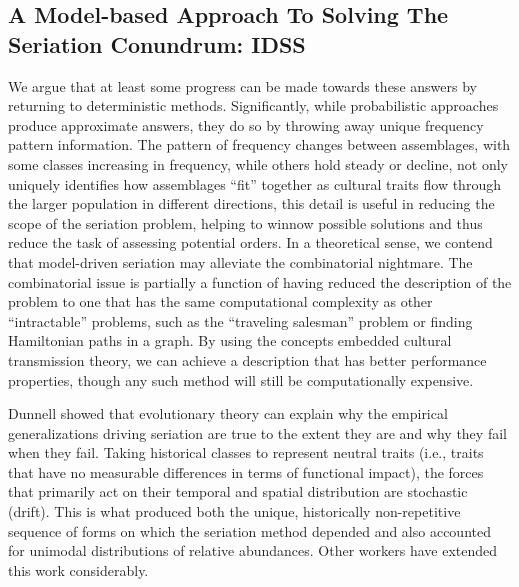 \documentclass[10pt,letterpaper]{article}
\begin{document}
\subsection*{A Model-based Approach To Solving The Seriation Conundrum: IDSS}
We argue that at least some progress can be made towards these answers by returning to deterministic methods. Significantly, while probabilistic approaches produce approximate answers, they do so by throwing away unique frequency pattern information.  The pattern of frequency changes between assemblages, with some classes increasing in frequency, while others hold steady or decline, not only uniquely identifies how assemblages “fit” together as cultural traits flow through the larger population in different directions, this detail is useful in reducing the scope of the seriation problem, helping to winnow possible solutions and thus reduce the task of assessing potential orders. In a theoretical sense, we contend that model-driven seriation may alleviate the combinatorial nightmare. The combinatorial issue is partially a function of having reduced the description of the problem to one that has the same computational complexity as other ``intractable'' problems, such as the ``traveling salesman'' problem or finding Hamiltonian paths in a graph. By using the concepts embedded cultural transmission theory, we can achieve a description that has better performance properties, though any such method will still be computationally expensive. 

Dunnell \cite{Dunnell1982} showed that evolutionary theory can explain why the empirical generalizations driving seriation are true to the extent they are and why they fail when they fail. Taking historical classes to represent neutral traits (i.e., traits that have no measurable differences in terms of functional impact), the forces that primarily act on their temporal and spatial distribution are stochastic (drift). This is what produced both the unique, historically non-repetitive sequence of forms on which the seriation method depended and also accounted for unimodal distributions of relative abundances. Other workers \cite{Lipo1997Population,Lipo2001a,Lipo2008,lyman2006seriation,Neiman1995,Teltser1995} have extended this work considerably. 
\end{document}
